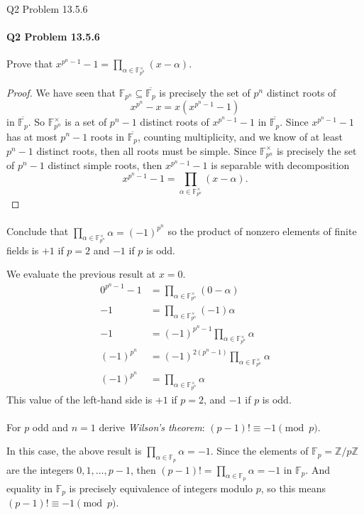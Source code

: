 \documentclass[12pt]{article}
\newenvironment{fullbox}{\begin{lrbox}{\savefullbox}\begin{minipage}{\dimexpr\textwidth-2\fboxsep\relax}}{\end{minipage}\end{lrbox}\begin{center}\framebox[\textwidth]{\usebox{\savefullbox}}\end{center}}
\newenvironment{pbox}[1][]{\begin{fullbox}\ifx#1\empty\else\paragraph{#1}\fi}{\end{fullbox}}
\theoremstyle{definition}
\newcommand{\Z}{\mathbb{Z}}
\newcommand{\clo}{\overline}
\newcommand{\F}{\mathbb{F}}
\begin{document}
\newpage
\begin{pbox}[Q2 Problem 13.5.6]
    Prove that $x^{p^n - 1} - 1 = \prod_{\alpha \in \F_{p^n}^\times} (x - \alpha)$. 
\end{pbox}

\begin{proof}
    We have seen that $\F_{p^n} \subseteq \clo{\F_p}$ is precisely the set of $p^n$ distinct roots of
    \[
        x^{p^n} - x = x(x^{p^n - 1} - 1)
    \]
    in $\clo{\F_p}$. So $\F_{p^n}^\times$ is a set of $p^n - 1$ distinct roots of $x^{p^n - 1} - 1$ in $\clo{\F_p}$. Since $x^{p^n - 1} - 1$ has at most $p^n - 1$ roots in $\clo{\F_p}$, counting multiplicity, and we know of at least $p^n - 1$ distinct roots, then all roots must be simple. Since $\F_{p^n}^\times$ is precisely the set of $p^n - 1$ distinct simple roots, then $x^{p^n - 1} - 1$ is separable with decomposition
    \[
        x^{p^n - 1} - 1 = \prod_{\alpha \in \F_{p^n}^\times} (x - \alpha).
    \]

\end{proof}

\begin{pbox}[]
    Conclude that $\prod_{\alpha \in \F_{p^n}^\times} \alpha = (-1)^{p^n}$ so the product of nonzero elements of finite fields is $+1$ if $p = 2 $ and $-1$ if $p$ is odd. 
\end{pbox}

We evaluate the previous result at $x = 0$.
\begin{align*}
    0^{p^n - 1} - 1 &= \prod_{\alpha \in \F_{p^n}^\times} (0 - \alpha) \\
    -1 &= \prod_{\alpha \in \F_{p^n}^\times} (-1)\alpha \\
    -1 &= (-1)^{p^n-1}\prod_{\alpha \in \F_{p^n}^\times} \alpha \\
    (-1)^{p^n} &= (-1)^{2(p^n-1)}\prod_{\alpha \in \F_{p^n}^\times} \alpha \\
    (-1)^{p^n} &= \prod_{\alpha \in \F_{p^n}^\times} \alpha
\end{align*}
This value of the left-hand side is $+1$ if $p = 2$, and $-1$ if $p$ is odd.

\begin{pbox}[]
    For $p$ odd and $n = 1$ derive \textit{Wilson's theorem}: $(p - 1)! \equiv -1 \pmod{p}$.
\end{pbox}

In this case, the above result is $\prod_{\alpha \in \F_p} \alpha = -1$. Since the elements of $\F_p = \Z/p\Z$ are the integers $0, 1, \dots, p - 1$, then $(p - 1)! = \prod_{\alpha \in \F_p} \alpha = -1$ in $\F_p$. And equality in $\F_p$ is precisely equivalence of integers modulo $p$, so this means $(p - 1)! \equiv -1 \pmod{p}$.
\end{document}
